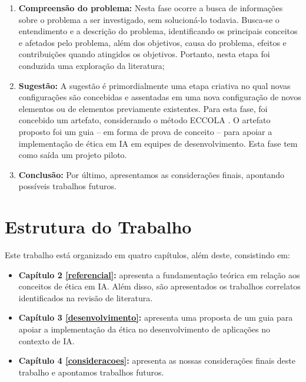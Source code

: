 \begin{enumerate}
    \item \textbf{Compreensão do problema:} Nesta fase ocorre a busca de informações sobre o problema a ser investigado, sem solucioná-lo todavia. Busca-se o entendimento e a descrição do problema, identificando os principais conceitos e afetados pelo problema, além dos objetivos, causa do problema, efeitos e contribuições quando atingidos os objetivos. Portanto, nesta etapa foi conduzida uma exploração da literatura;
    \item \textbf{Sugestão:} A sugestão é primordialmente uma etapa criativa no qual novas configurações são concebidas e assentadas em uma nova configuração de novos elementos ou de elementos previamente existentes. Para esta fase, foi concebido um artefato, considerando o método ECCOLA \cite{ECCOLA}. O artefato proposto foi um guia -- em forma de prova de conceito -- para apoiar a implementação de ética em IA em equipes de desenvolvimento. Esta fase tem como saída um projeto piloto.
    \item \textbf{Conclusão:} Por último, apresentamos as considerações finais, apontando possíveis trabalhos futuros.
\end{enumerate}

\section{Estrutura do Trabalho}

Este trabalho está organizado em quatro capítulos, além deste, consistindo em:
\begin{itemize}
    \item \textbf{Capítulo 2 \ref{referencial}:} apresenta a fundamentação teórica em relação aos conceitos de ética em IA. Além disso, são apresentados os trabalhos correlatos identificados na revisão de literatura.
    \item \textbf{Capítulo 3 \ref{desenvolvimento}:} apresenta uma proposta de um guia para apoiar a implementação da ética no desenvolvimento de aplicações no contexto de IA.
    \item \textbf{Capítulo 4 \ref{consideracoes}:} apresenta as nossas considerações finais deste trabalho e apontamos trabalhos futuros.
\end{itemize}